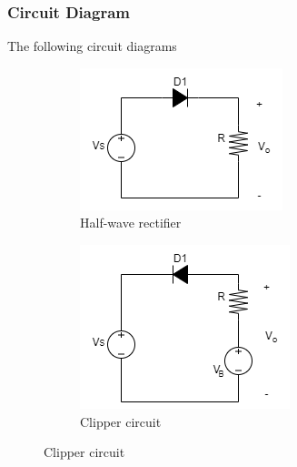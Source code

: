     \subsubsection{Circuit Diagram}
        The following circuit diagrams 
        \begin{figure}[H]
            \centering
            \begin{subfigure}{0.4\textwidth}
                \includegraphics[width=1\linewidth]{Experiment_02/Circuits/Lab2a.png}
                \caption{Half-wave rectifier}
                \label{cir:2a}
            \end{subfigure}
            \begin{subfigure}{0.4\textwidth}
                \includegraphics[width=1\linewidth]{Experiment_02/Circuits/Lab2b.png}
                \caption{Clipper circuit}
                \label{cir:2b}
            \end{subfigure}


\end{figure}
